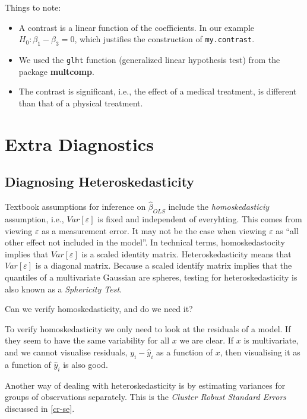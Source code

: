 \documentclass[]{book}
\providecommand{\tightlist}{%
  \setlength{\itemsep}{0pt}\setlength{\parskip}{0pt}}
\theoremstyle{definition}
\theoremstyle{definition}
\theoremstyle{definition}
\theoremstyle{remark}
\begin{document}
Things to note:

\begin{itemize}
\tightlist
\item
  A contrast is a linear function of the coefficients. In our example \(H_0:\beta_1-\beta_3=0\), which justifies the construction of \texttt{my.contrast}.
\item
  We used the \texttt{glht} function (generalized linear hypothesis test) from the package \textbf{multcomp}.
\item
  The contrast is significant, i.e., the effect of a medical treatment, is different than that of a physical treatment.
\end{itemize}

\hypertarget{extra-diagnostics}{%
\section{Extra Diagnostics}\label{extra-diagnostics}}

\hypertarget{diagnosing-heteroskedasticity}{%
\subsection{Diagnosing Heteroskedasticity}\label{diagnosing-heteroskedasticity}}

Textbook assumptions for inference on \(\hat \beta_{OLS}\) include the \emph{homoskedasticiy} assumption, i.e., \(Var[\varepsilon]\) is fixed and independent of everyhting.
This comes from viewing \(\varepsilon\) as a measurement error.
It may not be the case when viewing \(\varepsilon\) as ``all other effect not included in the model''.
In technical terms, homoskedastocity implies that \(Var[\varepsilon]\) is a scaled identity matrix.
Heteroskedasticity means that \(Var[\varepsilon]\) is a diagonal matrix.
Because a scaled identify matrix implies that the quantiles of a multivariate Gaussian are spheres, testing for heteroskedasticity is also known as a \emph{Sphericity Test}.

Can we verify homoskedasticity, and do we need it?

To verify homoskedasticity we only need to look at the residuals of a model. If they seem to have the same variability for all \(x\) we are clear.
If \(x\) is multivariate, and we cannot visualise residuals, \(y_i-\hat y_i\) as a function of \(x\), then visualising it as a function of \(\hat y_i\) is also good.

Another way of dealing with heteroskedasticity is by estimating variances for groups of observations separately.
This is the \emph{Cluster Robust Standard Errors} discussed in \ref{cr-se}.
\end{document}
